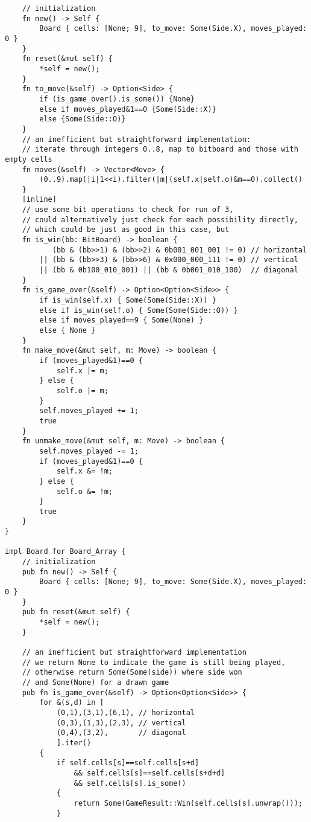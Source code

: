 \documentclass[10pt,dvipdfmx]{report}
\begin{document}
{\begin{verbatim}
    // initialization
    fn new() -> Self {
        Board { cells: [None; 9], to_move: Some(Side.X), moves_played: 0 }
    }
    fn reset(&mut self) {
        *self = new();
    }
    fn to_move(&self) -> Option<Side> {
        if (is_game_over().is_some()) {None}
        else if moves_played&1==0 {Some(Side::X)}
        else {Some(Side::O)}
    }
    // an inefficient but straightforward implementation:
    // iterate through integers 0..8, map to bitboard and those with empty cells
    fn moves(&self) -> Vector<Move> {
        (0..9).map(|i|1<<i).filter(|m|(self.x|self.o)&m==0).collect()
    }
    [inline]
    // use some bit operations to check for run of 3,
    // could alternatively just check for each possibility directly,
    // which could be just as good in this case, but 
    fn is_win(bb: BitBoard) -> boolean {
           (bb & (bb>>1) & (bb>>2) & 0b001_001_001 != 0) // horizontal
        || (bb & (bb>>3) & (bb>>6) & 0x000_000_111 != 0) // vertical
        || (bb & 0b100_010_001) || (bb & 0b001_010_100)  // diagonal
    }
    fn is_game_over(&self) -> Option<Option<Side>> {
        if is_win(self.x) { Some(Some(Side::X)) }
        else if is_win(self.o) { Some(Some(Side::O)) }
        else if moves_played==9 { Some(None) }
        else { None }
    }
    fn make_move(&mut self, m: Move) -> boolean {
        if (moves_played&1)==0 {
            self.x |= m;
        } else {
            self.o |= m;
        }
        self.moves_played += 1;
        true
    }
    fn unmake_move(&mut self, m: Move) -> boolean {
        self.moves_played -= 1;
        if (moves_played&1)==0 {
            self.x &= !m;
        } else {
            self.o &= !m;
        }
        true
    }
}

impl Board for Board_Array {
    // initialization
    pub fn new() -> Self {
        Board { cells: [None; 9], to_move: Some(Side.X), moves_played: 0 }
    }
    pub fn reset(&mut self) {
        *self = new();
    }

    // an inefficient but straightforward implementation
    // we return None to indicate the game is still being played,
    // otherwise return Some(Some(side)) where side won
    // and Some(None) for a drawn game
    pub fn is_game_over(&self) -> Option<Option<Side>> {
        for &(s,d) in [
            (0,1),(3,1),(6,1), // horizontal
            (0,3),(1,3),(2,3), // vertical
            (0,4),(3,2),       // diagonal
            ].iter()
        {
            if self.cells[s]==self.cells[s+d]
                && self.cells[s]==self.cells[s+d+d]
                && self.cells[s].is_some()
            {
                return Some(GameResult::Win(self.cells[s].unwrap()));
            }


\end{verbatim}}
\end{document}
